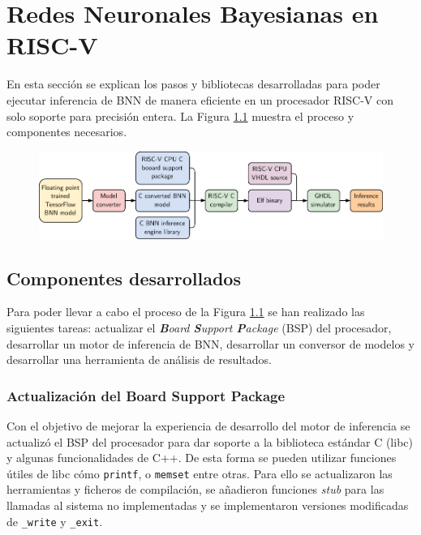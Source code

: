\chapter{Redes Neuronales Bayesianas en RISC-V}

En esta sección se explican los pasos y bibliotecas desarrolladas para poder ejecutar inferencia de BNN de manera eficiente en un procesador RISC-V con solo soporte para precisión entera. La Figura \ref{fig:experiment_pipeline} muestra el proceso y componentes necesarios.

\begin{figure}[h]
    \centering
    \includegraphics[width=\textwidth]{Imagenes/experiment_pipeline.pdf}
    \caption{\todo}
    \label{fig:experiment_pipeline}
\end{figure}

\section{Componentes desarrollados}

Para poder llevar a cabo el proceso de la Figura \ref{fig:experiment_pipeline} se han realizado las siguientes tareas: actualizar el \textit{\textbf{B}oard \textbf{S}upport \textbf{P}ackage} (BSP) del procesador, desarrollar un motor de inferencia de BNN, desarrollar un conversor de modelos y desarrollar una herramienta de análisis de resultados.

\subsection{Actualización del Board Support Package}

Con el objetivo de mejorar la experiencia de desarrollo del motor de inferencia se actualizó el BSP del procesador para dar soporte a la biblioteca estándar C (libc) y algunas funcionalidades de C++. De esta forma se pueden utilizar funciones útiles de libc cómo \texttt{printf}, o \texttt{memset} entre otras. Para ello se actualizaron las herramientas y ficheros de compilación, se añadieron funciones \textit{stub} para las llamadas al sistema no implementadas y se implementaron versiones modificadas de \texttt{\_write} y \texttt{\_exit}.

